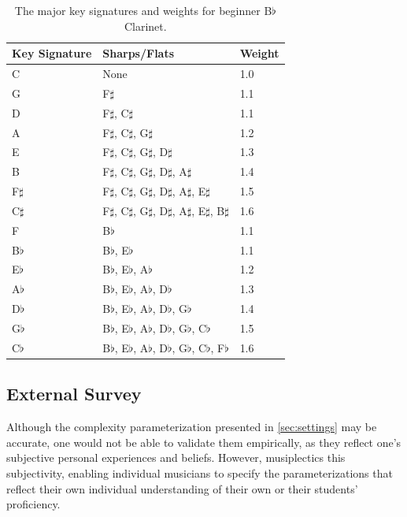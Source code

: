 \documentclass[10pt,preprint]{sigplanconf}
\begin{document}
\begin{table}
	\centering
    \begin{tabular}{| l | l | l |}
        \hline
        Key Signature & Sharps/Flats & Weight \\ \hline
        C & None & 1.0 \\ \hline
        G & F$\sharp$ & 1.1 \\ \hline 
        D & F$\sharp$, C$\sharp$ & 1.1 \\ \hline
        A & F$\sharp$, C$\sharp$, G$\sharp$ & 1.2 \\ \hline
        E & F$\sharp$, C$\sharp$, G$\sharp$, D$\sharp$ & 1.3 \\ \hline
        B & F$\sharp$, C$\sharp$, G$\sharp$, D$\sharp$, A$\sharp$ & 1.4 \\ \hline
        F$\sharp$ & F$\sharp$, C$\sharp$, G$\sharp$, D$\sharp$, A$\sharp$, E$\sharp$ & 1.5 \\ \hline
        C$\sharp$ & F$\sharp$, C$\sharp$, G$\sharp$, D$\sharp$, A$\sharp$, E$\sharp$, B$\sharp$ & 1.6 \\ \hline
        F & B$\flat$ & 1.1 \\ \hline
        B$\flat$ & B$\flat$, E$\flat$ & 1.1 \\ \hline
        E$\flat$ & B$\flat$, E$\flat$, A$\flat$ & 1.2 \\ \hline
        A$\flat$ & B$\flat$, E$\flat$, A$\flat$, D$\flat$ & 1.3 \\ \hline
        D$\flat$ & B$\flat$, E$\flat$, A$\flat$, D$\flat$, G$\flat$ & 1.4 \\ \hline
        G$\flat$ & B$\flat$, E$\flat$, A$\flat$, D$\flat$, G$\flat$, C$\flat$ & 1.5 \\ \hline
        C$\flat$ & B$\flat$, E$\flat$, A$\flat$, D$\flat$, G$\flat$, C$\flat$, F$\flat$ & 1.6 \\
        \hline
    \end{tabular}
	\caption{The major key signatures and weights for beginner B$\flat$ Clarinet.}
	\label{table:key}
\end{table}



\subsection{External Survey} 
\label{sec:survey}

Although the complexity parameterization presented in \ref{sec:settings} may be accurate, one would not be able to validate them empirically, as they reflect one's subjective personal experiences and beliefs. However, musiplectics  this subjectivity, enabling individual musicians to specify the parameterizations that reflect their own individual understanding of their own or their students' proficiency.
\end{document}
